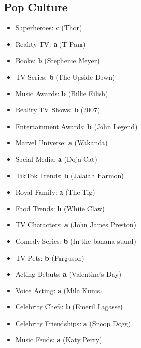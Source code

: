 \documentclass[12pt,a4paper]{book}
\begin{document}
\subsection{Pop Culture}
\begin{itemize}
\item Superheroes: \textbf{c} (Thor)
\item Reality TV: \textbf{a} (T-Pain)
\item Books: \textbf{b} (Stephenie Meyer)
\item TV Series: \textbf{b} (The Upside Down)
\item Music Awards: \textbf{b} (Billie Eilish)
\item Reality TV Shows: \textbf{b} (2007)
\item Entertainment Awards: \textbf{b} (John Legend)
\item Marvel Universe: \textbf{a} (Wakanda)
\item Social Media: \textbf{a} (Doja Cat)
\item TikTok Trends: \textbf{b} (Jalaiah Harmon)
\item Royal Family: \textbf{a} (The Tig)
\item Food Trends: \textbf{b} (White Claw)
\item TV Characters: \textbf{a} (John James Preston)
\item Comedy Series: \textbf{b} (In the banana stand)
\item TV Pets: \textbf{b} (Furguson)
\item Acting Debuts: \textbf{a} (Valentine's Day)
\item Voice Acting: \textbf{a} (Mila Kunis)
\item Celebrity Chefs: \textbf{b} (Emeril Lagasse)
\item Celebrity Friendships: \textbf{a} (Snoop Dogg)
\item Music Feuds: \textbf{a} (Katy Perry)
\end{itemize}
\end{document}
